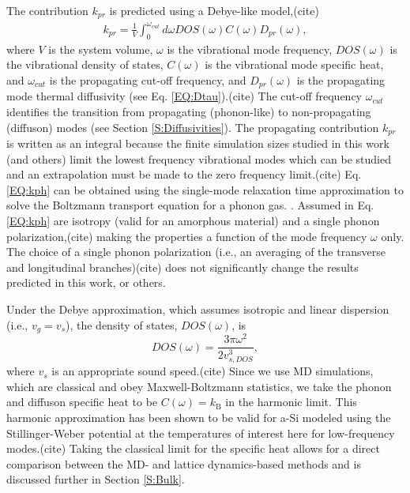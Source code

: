 \documentclass[aps,prb,onecolumn,preprint,superscriptaddress,footinbib,amsmath,amssymb,floatfix]{revtex4}
\begin{document}
The contribution $k_{pr}$ is predicted using a Debye-like model,(cite) 
\begin{equation}\label{EQ:kph}
\begin{split}
k_{pr} = \frac{1}{V}\int_{0}^{\omega_{cut}} 
d\omega DOS(\omega) C(\omega) D_{pr}(\omega),
\end{split}
\end{equation}
where $V$ is the system volume, $\omega$ is the vibrational mode 
frequency, $DOS(\omega)$ is the vibrational 
density of states, $C(\omega)$ is the vibrational mode specific heat, 
and $\omega_{cut}$ is the propagating cut-off frequency, and 
$D_{pr}(\omega)$ is the propagating mode thermal diffusivity 
(see Eq. \eqref{EQ:Dtau}).(cite) 
The cut-off frequency $\omega_{cut}$ identifies the transition from 
propagating (phonon-like) to non-propagating (diffuson) modes 
(see Section \ref{S:Diffusivities}).
\cite{feldman_thermal_1993,cahill_thermal_1994,
feldman_numerical_1999,liu_high_2009,yang_anomalously_2010}
The propagating contribution $k_{pr}$ is written as an integral because 
the finite simulation sizes studied in this work (and others)
\cite{feldman_thermal_1993,feldman_numerical_1999}
limit the lowest 
frequency vibrational modes which can be studied and an extrapolation 
must be made to the zero frequency limit.(cite)  
Eq. \eqref{EQ:kph} can be obtained using the single-mode relaxation
time approximation to solve 
the Boltzmann transport equation for a phonon gas.
\cite{ziman_electrons_2001}. Assumed in Eq. \eqref{EQ:kph} 
are isotropy (valid for an amorphous material) and a single phonon 
polarization,(cite) making the  
properties a function of the mode frequency $\omega$ only. The 
choice of a single phonon polarization (i.e., an averaging 
of the transverse and longitudinal branches)(cite) does not 
significantly change 
the results predicted in this work, or others.
\cite{feldman_thermal_1993,cahill_thermal_1994,
feldman_numerical_1999,baldi_thermal_2008,liu_high_2009,
yang_anomalously_2010} 

Under the Debye approximation, 
which assumes isotropic and linear dispersion (i.e., $v_g = v_s$), 
the density of states, $DOS(\omega)$, is
\begin{equation}\label{EQ:DOS_debye}
DOS(\omega) = \frac{3\pi\omega^2}{2v_{s,DOS}^3},
\end{equation}
where $v_s$ is an appropriate sound speed.(cite) 
Since we use MD simulations, which are classical 
and obey Maxwell-Boltzmann 
statistics,\cite{mcquarrie_statistical_2000} we take the phonon and diffuson 
specific heat to be $C(\omega) = k_{\text{B}}$ in the 
harmonic limit. This harmonic approximation has been shown to be valid 
for a-Si modeled using the Stillinger-Weber potential at the temperatures of 
interest here for low-frequency modes.(cite) 
Taking the classical limit for the specific heat allows for a direct 
comparison between 
the MD- and lattice dynamics-based methods and is discussed further in
Section \ref{S:Bulk}. 
\end{document}
